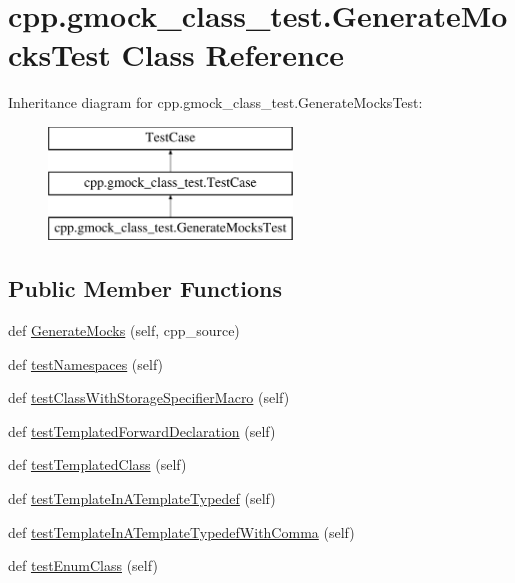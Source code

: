 \hypertarget{classcpp_1_1gmock__class__test_1_1GenerateMocksTest}{}\section{cpp.\+gmock\+\_\+class\+\_\+test.\+Generate\+Mocks\+Test Class Reference}
\label{classcpp_1_1gmock__class__test_1_1GenerateMocksTest}
Inheritance diagram for cpp.\+gmock\+\_\+class\+\_\+test.\+Generate\+Mocks\+Test\+:\begin{figure}[H]
\begin{center}
\leavevmode
\includegraphics[height=3.000000cm]{classcpp_1_1gmock__class__test_1_1GenerateMocksTest}
\end{center}
\end{figure}
\subsection*{Public Member Functions}
\begin{DoxyCompactItemize}
\item 
def \mbox{\hyperlink{classcpp_1_1gmock__class__test_1_1GenerateMocksTest_afdce6749dca14c1aa90762d389d92c87}{Generate\+Mocks}} (self, cpp\+\_\+source)
\item 
def \mbox{\hyperlink{classcpp_1_1gmock__class__test_1_1GenerateMocksTest_a706812da9e8f79a689c707b4032db2d2}{test\+Namespaces}} (self)
\item 
def \mbox{\hyperlink{classcpp_1_1gmock__class__test_1_1GenerateMocksTest_aba1ab8ae8a897ea9c22a47bcd1524254}{test\+Class\+With\+Storage\+Specifier\+Macro}} (self)
\item 
def \mbox{\hyperlink{classcpp_1_1gmock__class__test_1_1GenerateMocksTest_a18cb0f03ecd4e54d0f787694c1513731}{test\+Templated\+Forward\+Declaration}} (self)
\item 
def \mbox{\hyperlink{classcpp_1_1gmock__class__test_1_1GenerateMocksTest_a4098c99b66f0cbea7be9e66352a20f4d}{test\+Templated\+Class}} (self)
\item 
def \mbox{\hyperlink{classcpp_1_1gmock__class__test_1_1GenerateMocksTest_a32a2840352d970c631d7be1b6d1970e6}{test\+Template\+In\+A\+Template\+Typedef}} (self)
\item 
def \mbox{\hyperlink{classcpp_1_1gmock__class__test_1_1GenerateMocksTest_a67d1336b8782257fcfcdbda8c8d4f794}{test\+Template\+In\+A\+Template\+Typedef\+With\+Comma}} (self)
\item 
def \mbox{\hyperlink{classcpp_1_1gmock__class__test_1_1GenerateMocksTest_a2bbddbe36e49edf3cb9116c3dd0fe814}{test\+Enum\+Class}} (self)
\end{DoxyCompactItemize}


